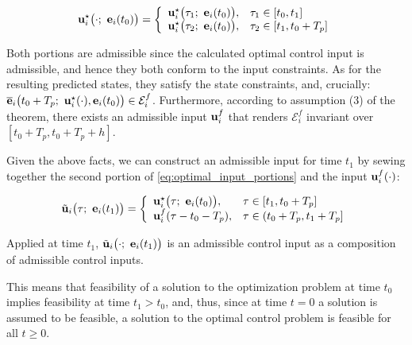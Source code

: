 \begin{equation}
  \bm{\mathbf{u}}_i^{\star}\big(\cdot;\ \bm{\mathbf{e}}_i(t_0)\big) = \left\{ \\
      \begin{array}{ll}
        \bm{\mathbf{u}}_i^{\star}\big(\tau_1;\ \bm{\mathbf{e}}_i(t_0)\big), & \tau_1 \in [t_0, t_1] \\
        \bm{\mathbf{u}}_i^{\star}\big(\tau_2;\ \bm{\mathbf{e}}_i(t_0)\big), & \tau_2 \in [t_1, t_0 + T_p]
      \end{array}
      \right.
  \label{eq:optimal_input_portions}
\end{equation}

Both portions are admissible since the calculated optimal control input is
admissible, and hence they both conform to the input constraints.
As for the resulting predicted states, they satisfy the state constraints, and,
crucially: $\overline{\bm{\mathbf{e}}}_i\big(t_0 + T_p;\ \bm{\mathbf{u}}_i^{\star}(\cdot), \bm{\mathbf{e}}_i(t_0)\big) \in \mathcal{E}_i^f$.
Furthermore, according to assumption (3) of the theorem, there exists an
admissible input $\bm{\mathbf{u}}_i^f$ that renders $\mathcal{E}_i^f$ invariant over
$[t_0 + T_p, t_0 + T_p + h]$.

Given the above facts, we can construct an admissible input for time $t_1$
by sewing together the second portion of \eqref{eq:optimal_input_portions}
and the input $\bm{\mathbf{u}}_i^f(\cdot)$:

\begin{equation}
  \tilde{\bm{\mathbf{u}}}_i\big(\tau;\ \bm{\mathbf{e}}_i(t_1)\big) = \left\{ \\
      \begin{array}{ll}
        \bm{\mathbf{u}}_i^{\star}\big(\tau;\ \bm{\mathbf{e}}_i(t_0)\big), & \tau \in [t_1, t_0 + T_p] \\
        \bm{\mathbf{u}}_i^f(\tau - t_0 - T_p), & \tau \in (t_0 + T_p, t_1 + T_p]
      \end{array}
      \right.
\end{equation}

Applied at time $t_1$, $\tilde{\bm{\mathbf{u}}}_i\big(\cdot;\ \bm{\mathbf{e}}_i(t_1)\big)$
is an admissible control input as a composition of admissible control inputs.

This means that feasibility of a solution to the optimization problem at time
$t_0$ implies feasibility at time $t_1 > t_0$, and, thus, since at time $t=0$
a solution is assumed to be feasible, a solution to the optimal control problem
is feasible for all $t \geq 0$.\\


